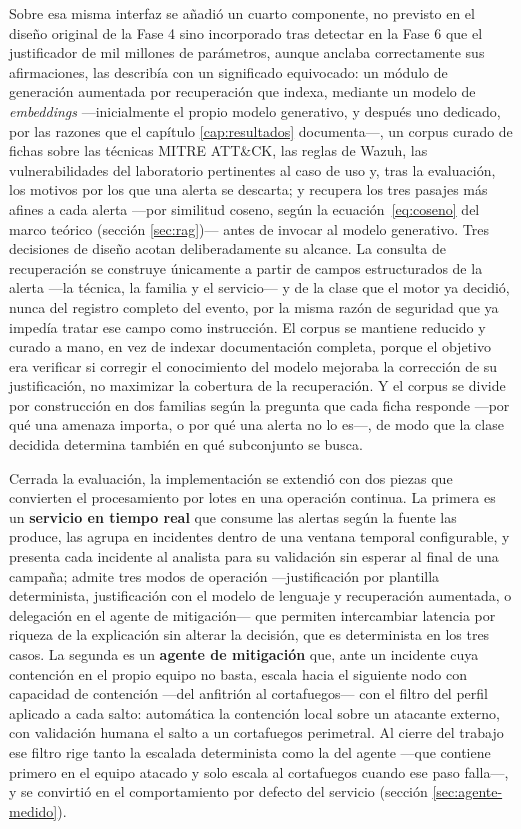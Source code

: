 Sobre esa misma interfaz se añadió un cuarto componente, no previsto en el diseño original de la
Fase 4 sino incorporado tras detectar en la Fase 6 que el justificador de mil millones de
parámetros, aunque anclaba correctamente sus afirmaciones, las describía con un significado
equivocado: un módulo de generación aumentada por recuperación que indexa, mediante un modelo de
\emph{embeddings} ---inicialmente el propio modelo generativo, y después uno dedicado, por las
razones que el capítulo \ref{cap:resultados} documenta---, un corpus curado de fichas sobre las
técnicas MITRE ATT\&CK, las reglas de Wazuh, las vulnerabilidades del laboratorio pertinentes al
caso de uso y, tras la evaluación, los motivos por los que una alerta se descarta; y recupera los
tres pasajes más afines a cada alerta ---por similitud coseno, según la ecuación~\eqref{eq:coseno} del
marco teórico (sección \ref{sec:rag})--- antes de invocar al modelo generativo.
Tres decisiones de diseño acotan deliberadamente su alcance. La consulta de recuperación se
construye únicamente a partir de campos estructurados de la alerta ---la técnica, la familia y el
servicio--- y de la clase que el motor ya decidió, nunca del registro completo del evento, por la
misma razón de seguridad que ya impedía tratar ese campo como instrucción. El corpus se mantiene
reducido y curado a mano, en vez de indexar documentación completa, porque el objetivo era
verificar si corregir el conocimiento del modelo mejoraba la corrección de su justificación, no
maximizar la cobertura de la recuperación. Y el corpus se divide por construcción en dos familias
según la pregunta que cada ficha responde ---por qué una amenaza importa, o por qué una alerta no
lo es---, de modo que la clase decidida determina también en qué subconjunto se busca.

Cerrada la evaluación, la implementación se extendió con dos piezas que convierten el procesamiento
por lotes en una operación continua. La primera es un \textbf{servicio en tiempo real} que consume
las alertas según la fuente las produce, las agrupa en incidentes dentro de una ventana temporal
configurable, y presenta cada incidente al analista para su validación sin esperar al final de una
campaña; admite tres modos de operación ---justificación por plantilla determinista, justificación
con el modelo de lenguaje y recuperación aumentada, o delegación en el agente de mitigación--- que
permiten intercambiar latencia por riqueza de la explicación sin alterar la decisión, que es
determinista en los tres casos. La segunda es un \textbf{agente de mitigación} que, ante un
incidente cuya contención en el propio equipo no basta, escala hacia el siguiente nodo con capacidad
de contención ---del anfitrión al cortafuegos--- con el filtro del perfil aplicado a cada salto:
automática la contención local sobre un atacante externo, con validación humana el salto a un
cortafuegos perimetral. Al cierre del trabajo ese filtro rige tanto la escalada determinista como
la del agente ---que contiene primero en el equipo atacado y solo escala al cortafuegos cuando ese
paso falla---, y se convirtió en el comportamiento por defecto del servicio (sección
\ref{sec:agente-medido}).

